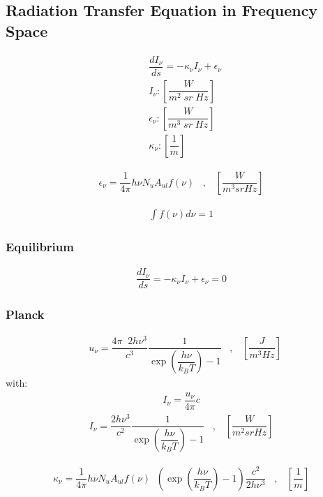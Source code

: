 
\subsection{Radiation Transfer Equation in Frequency Space}

\begin{align}
&\dfrac{d I_{\nu}}{ds} = - \kappa_{\nu} I_{\nu} + \epsilon_{\nu} \\
&I_{\nu}        : \left[\dfrac{W}{m^2 \; sr \; Hz}\right] \\
&\epsilon_{\nu} : \left[\dfrac{W}{m^3 \; sr \; Hz}\right] \\
&\kappa_{\nu}   : \left[\dfrac{1}{m}\right]
\end{align}

\begin{align}
\epsilon_{\nu} = \dfrac{1}{4 \pi} h \nu N_u A_{ul} f(\nu) \;\;\; , \;\;\; \left[\dfrac{W}{m^3 sr Hz}\right]
\end{align}

\begin{align}
\int f(\nu) d\nu = 1
\end{align}

\subsubsection{Equilibrium}
\begin{align}
\dfrac{d I_{\nu}}{ds} = - \kappa_{\nu} I_{\nu} + \epsilon_{\nu} = 0
\end{align}

\subsubsection{Planck}
\begin{align}
&u_{\nu} = \dfrac{4 \pi \;\; 2 h \nu^3}{c^3}  \dfrac{1}{\exp\left(\dfrac{h \nu}{k_B T}\right) - 1} \;\;\; , \;\;\; \left[\dfrac{J}{m^3 Hz}\right]
\end{align}
with:
\begin{align}
I_{\nu} = \dfrac{u_{\nu}}{4 \pi} c
\end{align}
\begin{align}
I_{\nu} = \dfrac{2 h \nu^3}{c^2}  \dfrac{1}{\exp\left(\dfrac{h\nu}{k_B T}\right) - 1} \;\;\; , \;\;\; \left[\dfrac{W}{m^2 sr Hz}\right]
\end{align}

\begin{align}
\kappa_{\nu} = \dfrac{1}{4 \pi} h \nu N_u A_{ul} f(\nu) \;\; \left(\exp\left(\dfrac{h \nu}{k_B T}\right) - 1\right) \dfrac{c^2}{2 h \nu^3}   \;\;\; , \;\;\; \left[\dfrac{1}{m}\right]
\end{align}

